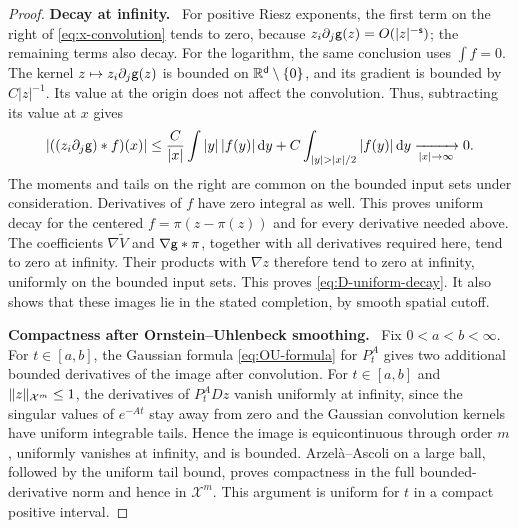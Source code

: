 \documentclass[11pt,reqno]{amsart}
\numberwithin{equation}{section}
\theoremstyle{plain}
\theoremstyle{remark}
\DeclarePairedDelimiter{\norm}{\lVert}{\rVert}
\renewcommand{\d}{\mathsf{d}}\newcommand{\s}{\mathsf{s}}
\newcommand{\parheading}[1]{\par\medskip\noindent\textbf{#1}\ }
\newcommand{\Xspace}{\mathcal X}
\begin{document}
\begin{proof}
\parheading{Decay at infinity.}
For positive Riesz exponents, the first term on the right of \eqref{eq:x-convolution} tends to zero, because $z_i\partial_j\g(z)=O(|z|^{-\s})$; the remaining terms also decay. For the logarithm, the same conclusion uses $\int f=0$. The kernel $z\mapsto z_i\partial_j\mathsf g(z)$ is bounded on $\R^\d\setminus\{0\}$, and its gradient is bounded by $C|z|^{-1}$. Its value at the origin does not affect the convolution. Thus, subtracting its value at $x$ gives
\begin{equation}\label{eq:log-convolution-cancellation}
 \left|((z_i\partial_j\g)*f)(x)\right|
 \le\frac C{|x|}\int|y|\,|f(y)|\dd y+C\int_{|y|>|x|/2}|f(y)|\dd y
 \xrightarrow[|x|\to\infty]{}0.
\end{equation}
The moments and tails on the right are common on the bounded input sets under consideration. Derivatives of $f$ have zero integral as well. This proves uniform decay for the centered $f=\pi(z-\pi(z))$ and for every derivative needed above. The coefficients $\nabla\widetilde V$ and $\nabla\mathsf g*\pi$, together with all derivatives required here, tend to zero at infinity. Their products with $\nabla z$ therefore tend to zero at infinity, uniformly on the bounded input sets. This proves \eqref{eq:D-uniform-decay}. It also shows that these images lie in the stated completion, by smooth spatial cutoff.

\parheading{Compactness after Ornstein--Uhlenbeck smoothing.}
Fix $0<a<b<\infty$. For $t\in[a,b]$, the Gaussian formula \eqref{eq:OU-formula} for $P_t^A$ gives two additional bounded derivatives of the image after convolution. For $t\in[a,b]$ and $\norm z_{\Xspace^m}\le1$, the derivatives of $P_t^ADz$ vanish uniformly at infinity, since the singular values of $e^{-At}$ stay away from zero and the Gaussian convolution kernels have uniform integrable tails. Hence the image is equicontinuous through order $m$, uniformly vanishes at infinity, and is bounded. Arzel\`a--Ascoli on a large ball, followed by the uniform tail bound, proves compactness in the full bounded-derivative norm and hence in $\Xspace^m$. This argument is uniform for $t$ in a compact positive interval.


\end{proof}
\end{document}
